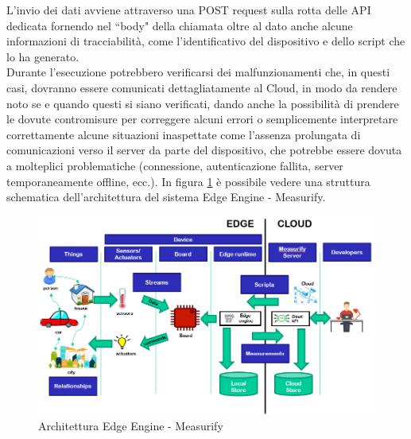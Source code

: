 L'invio dei dati avviene attraverso una POST request sulla rotta delle API dedicata fornendo nel “body" della chiamata oltre al dato anche alcune informazioni di tracciabilità, come l'identificativo del dispositivo e dello script che lo ha generato.\\
Durante l’esecuzione potrebbero verificarsi dei malfunzionamenti che, in questi casi, dovranno essere comunicati dettagliatamente al Cloud, in modo da rendere noto se e quando questi si siano verificati, dando anche la possibilità di prendere le dovute contromisure per correggere alcuni errori o semplicemente interpretare correttamente alcune situazioni inaspettate come l'assenza prolungata di comunicazioni verso il server da parte del dispositivo, che potrebbe essere dovuta a molteplici problematiche (connessione, autenticazione fallita, server temporaneamente offline, ecc.).
In figura \ref{edgecloud} è possibile vedere una struttura schematica dell'architettura del sistema Edge Engine - Measurify.
\begin{figure}[H]
	\centering
	\includegraphics[width=\linewidth, height= 0.35 \textheight]{pics/edgearch}
	\caption{Architettura Edge Engine - Measurify}
	\label{edgecloud}
\end{figure}
